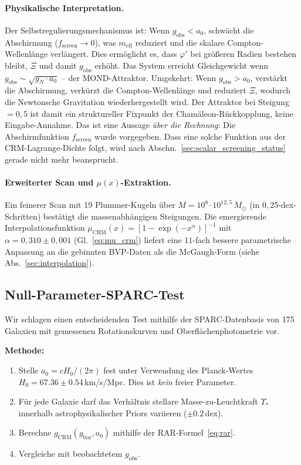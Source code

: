 \documentclass[aps,prd,twocolumn,superscriptaddress,nofootinbib]{revtex4-2}
\begin{document}
\paragraph{Physikalische Interpretation.}
Der Selbstregulierungsmechanismus ist: Wenn $g_{\mathrm{obs}} < a_0$, schw\"acht die Abschirmung ($f_{\mathrm{screen}} \to 0$), was $m_{\mathrm{eff}}$ reduziert und die skalare Compton-Wellenl\"ange verl\"angert. Dies erm\"oglicht es, dass $\varphi'$ bei gr\"o\ss{}eren Radien bestehen bleibt, $\Xi$ und damit $g_{\mathrm{obs}}$ erh\"oht. Das System erreicht Gleichgewicht wenn $g_{\mathrm{obs}} \sim \sqrt{g_N \cdot a_0}$ -- der MOND-Attraktor. Umgekehrt: Wenn $g_{\mathrm{obs}} > a_0$, verst\"arkt die Abschirmung, verk\"urzt die Compton-Wellenl\"ange und reduziert $\Xi$, wodurch die Newtonsche Gravitation wiederhergestellt wird. Der Attraktor bei Steigung~$= 0{,}5$ ist damit ein struktureller Fixpunkt der Cham\"aleon-R\"uckkopplung, keine Eingabe-Annahme. Das ist eine Aussage \textit{\"uber die Rechnung}: Die Abschirmfunktion $f_{\mathrm{screen}}$ wurde vorgegeben. Dass eine solche Funktion aus der CRM-Lagrange-Dichte folgt, wird nach Abschn.~\ref{sec:scalar_screening_status} gerade nicht mehr beansprucht.

\paragraph{Erweiterter Scan und $\mu(x)$-Extraktion.}
Ein feinerer Scan mit 19 Plummer-Kugeln \"uber $M = 10^{8}$--$10^{12{,}5}\,M_\odot$ (in $0{,}25$-dex-Schritten) best\"atigt die massenabh\"angigen Steigungen. Die emergierende Interpolationsfunktion $\mu_{\mathrm{CRM}}(x) = [1 - \exp(-x^\alpha)]^{-1}$ mit $\alpha = 0{,}310 \pm 0{,}001$ (Gl.~\ref{eq:mu_crm}) liefert eine $11$-fach bessere parametrische Anpassung an die gebinnten BVP-Daten als die McGaugh-Form (siehe Abs.~\ref{sec:interpolation}).

\subsection{Null-Parameter-SPARC-Test}
\label{sec:mcmc}

Wir schlagen einen entscheidenden Test mithilfe der SPARC-Datenbasis \cite{Lelli2016} von 175 Galaxien mit gemessenen Rotationskurven und Oberfl\"achenphotometrie vor.

\textbf{Methode:}
\begin{enumerate}
\item Stelle $a_0 = cH_0/(2\pi)$ fest unter Verwendung des Planck-Wertes $H_0 = 67.36 \pm 0.54$\,km/s/Mpc. Dies ist \textit{kein} freier Parameter.
\item F\"ur jede Galaxie darf das Verh\"altnis stellare Masse-zu-Leuchtkraft $\Upsilon_*$ innerhalb astrophysikalischer Priors variieren ($\pm 0.2$\,dex).
\item Berechne $g_{\mathrm{CRM}}(g_{\mathrm{bar}}, a_0)$ mithilfe der RAR-Formel~\eqref{eq:rar}.
\item Vergleiche mit beobachtetem $g_{\mathrm{obs}}$.
\end{enumerate}
\end{document}
